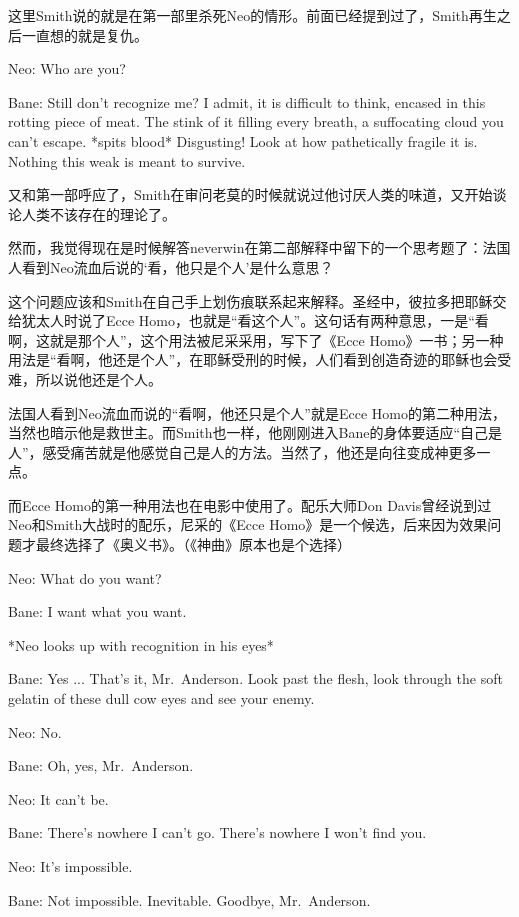 \documentclass[UTF8]{ctexart}
\newenvironment{myquote}{\color{green} \setlength{\leftskip}{6em} \setlength{\rightskip}{4em} \setlength{\parindent}{-2em}}{\par}
\begin{document}
这里Smith说的就是在第一部里杀死Neo的情形。前面已经提到过了，Smith再生之后一直想的就是复仇。

\begin{myquote}
Neo: Who are you?

Bane: Still don't recognize me? I admit, it is difficult to think, encased in this rotting piece of meat. The stink of it filling every breath, a suffocating cloud you can't escape. *spits blood* Disgusting! Look at how pathetically fragile it is. Nothing this weak is meant to survive.
\end{myquote}

又和第一部呼应了，Smith在审问老莫的时候就说过他讨厌人类的味道，又开始谈论人类不该存在的理论了。

然而，我觉得现在是时候解答neverwin在第二部解释中留下的一个思考题了：法国人看到Neo流血后说的‘看，他只是个人’是什么意思？

这个问题应该和Smith在自己手上划伤痕联系起来解释。圣经中，彼拉多把耶稣交给犹太人时说了Ecce Homo，也就是“看这个人”。这句话有两种意思，一是“看啊，这就是那个人”，这个用法被尼采采用，写下了《Ecce Homo》一书；另一种用法是“看啊，他还是个人”，在耶稣受刑的时候，人们看到创造奇迹的耶稣也会受难，所以说他还是个人。

法国人看到Neo流血而说的“看啊，他还只是个人”就是Ecce Homo的第二种用法，当然也暗示他是救世主。而Smith也一样，他刚刚进入Bane的身体要适应“自己是人”，感受痛苦就是他感觉自己是人的方法。当然了，他还是向往变成神更多一点。

而Ecce Homo的第一种用法也在电影中使用了。配乐大师Don Davis曾经说到过Neo和Smith大战时的配乐，尼采的《Ecce Homo》是一个候选，后来因为效果问题才最终选择了《奥义书》。（《神曲》原本也是个选择）

\begin{myquote}
Neo: What do you want?

Bane: I want what you want.

*Neo looks up with recognition in his eyes*

Bane: Yes ... That's it, Mr.~Anderson. Look past the flesh, look through the soft gelatin of these dull cow eyes and see your enemy.

Neo: No.

Bane: Oh, yes, Mr.~Anderson.

Neo: It can't be.

Bane: There's nowhere I can't go. There's nowhere I won't find you.

Neo: It's impossible.

Bane: Not impossible. Inevitable. Goodbye, Mr.~Anderson.
\end{myquote}
\end{document}
